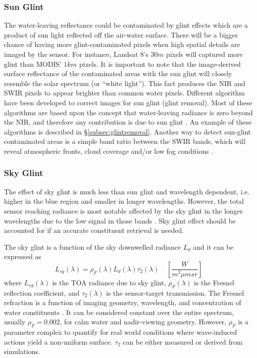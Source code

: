 \subsubsection*{Sun Glint}
The water-leaving reflectance could be contaminated by glint effects which are a product of sun light reflected off the air-water surface. There will be a bigger chance of having more glint-contaminated pixels when high spatial details are imaged by the sensor. For instance, Landsat 8's $30m$ pixels will captured more glint than MODIS' $1km$ pixels. It is important to note that the image-derived surface reflectance of the contaminated areas with the sun glint will closely resemble the solar spectrum (or ``white light''). This fact produces the NIR and SWIR pixels to appear brighter than common water pixels. Different algorithm have been developed to correct images for sun glint (glint removal). Most of these algorithms are based upon the concept that water-leaving radiance is zero beyond the NIR, and therefore any contribution is due to sun glint \cite{Pahlevan:2012}. An example of these algorithms is described in \S\ref{subsec:glintremoval}. Another way to detect sun-glint contaminated areas is a simple band ratio between the SWIR bands, which will reveal atmospheric fronts, cloud coverage and/or low fog conditions \cite{Pahlevan:2012}.
\subsubsection*{Sky Glint}
The effect of sky glint is much less than sun glint and wavelength dependent, i.e. higher in the blue region and smaller in longer wavelengths. However, the total sensor reaching radiance is most notable affected by the sky glint in the longer wavelengths due to the low signal in those bands \cite{Pahlevan:2012}. Sky glint effect should be accounted for if an accurate constituent retrieval is needed.

The sky glint is a function of the sky downwelled radiance $L_d$ and it can be expressed as
\begin{equation}
  L_{sg}(\lambda) = \rho_F(\lambda)L_d(\lambda)\tau_2(\lambda)~~~~~\left[\frac{W}{m^2\mu msr}\right]
\end{equation}
where $L_{sg}(\lambda)$ is the TOA radiance due to sky glint, $\rho_F(\lambda)$ is the Fresnel reflection coefficient, and $\tau_2(\lambda)$ is the sensor-target transmission. The Fresnel refraction is a function of imaging geometry, wavelength, and concentration of water constituents \cite{Pahlevan:2012}. It can be considered constant over the entire spectrum, usually $\rho_F=0.002$, for calm water and nadir-viewing geometry. However, $\rho_F$ is a parameter complex to quantify for real world conditions where wave-induced actions yield a non-uniform surface. $\tau_2$ can be either measured or derived from simulations.

